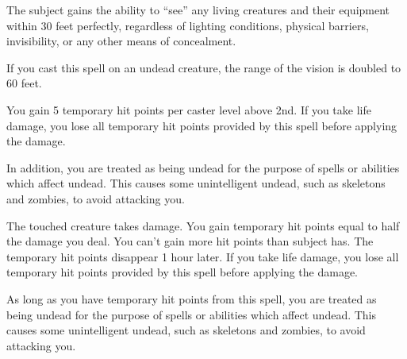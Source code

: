 \begin{spelleffect}
  The subject gains the ability to ``see'' any living creatures and their equipment within 30 feet perfectly, regardless of lighting conditions, physical barriers, invisibility, or any other means of concealment.

  If you cast this spell on an undead creature, the range of the vision is doubled to 60 feet.
\end{spelleffect}

\spellrng{\rngpers}
\spelldur{\durlong}
\begin{spelleffect}
  You gain 5 temporary hit points  per caster level above 2nd. If you take life damage, you lose all temporary hit points provided by this spell before applying the damage.

  In addition, you are treated as being undead for the purpose of spells or abilities which affect undead. This causes some unintelligent undead, such as skeletons and zombies, to avoid attacking you.
\end{spelleffect}

\begin{spelleffect}
  The touched creature takes damage. You gain temporary hit points equal to half the damage you deal. You can't gain more hit points than subject has. The temporary hit points disappear 1 hour later. If you take life damage, you lose all temporary hit points provided by this spell before applying the damage.

  As long as you have temporary hit points from this spell, you are treated as being undead for the purpose of spells or abilities which affect undead. This causes some unintelligent undead, such as skeletons and zombies, to avoid attacking you.
\end{spelleffect}

